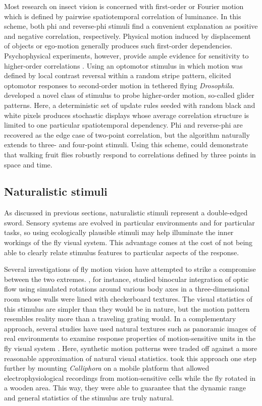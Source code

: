 Most research on insect vision is concerned with first-order or Fourier motion which is defined by pairwise spatiotemporal correlation of luminance. In this scheme, both phi and reverse-phi stimuli find a convenient explanation as positive and negative correlation, respectively. Physical motion induced by displacement of objects or ego-motion generally produces such first-order dependencies. Psychophysical experiments, however, provide ample evidence for sensitivity to higher-order correlations \citep{Lu:2001vf}. Using an optomotor stimulus in which motion was defined by local contrast reversal within a random stripe pattern, \citet{Theobald:2008et} elicited optomotor responses to second-order motion in tethered flying \textit{Drosophila}.
\citet{Hu:2010gx} developed a novel class of stimulus to probe higher-order motion, so-called glider patterns. Here, a deterministic set of update rules seeded with random black and white pixels produces stochastic displays whose average correlation structure is limited to one particular spatiotemporal dependency. Phi and reverse-phi are recovered as the edge case of two-point correlation, but the algorithm naturally extends to three- and four-point stimuli. Using this scheme, \citet{Clark:2014aa} could demonstrate that walking fruit flies robustly respond to correlations defined by three points in space and time.

\subsection{Naturalistic stimuli}
As discussed in previous sections, naturalistic stimuli represent a double-edged sword. Sensory systems are evolved in particular environments and for particular tasks, so using ecologically plausible stimuli may help illuminate the inner workings of the fly visual system. This advantage comes at the cost of not being able to clearly relate stimulus features to particular aspects of the response.

Several investigations of fly motion vision have attempted to strike a compromise between the two extremes. \citet{Wertz:2012kp}, for instance, studied binocular integration of optic flow using simulated rotations around various body axes in a three-dimensional room whose walls were lined with checkerboard textures. The visual statistics of this stimulus are simpler than they would be in nature, but the motion pattern resembles reality more than a traveling grating would. In a complementary approach, several studies have used natural textures such as panoramic images of real environments to examine response properties of motion-sensitive units in the fly visual system \citep{Straw:2008hh,OCarroll:2011gj}. Here, synthetic motion patterns were traded off against a more reasonable approximation of natural visual statistics. \citet{Lewen:2001tz} took this approach one step further by mounting \textit{Calliphora} on a mobile platform that allowed electrophysiological recordings from motion-sensitive cells while the fly rotated in a wooden area. This way, they were able to guarantee that the dynamic range and general statistics of the stimulus are truly natural.

